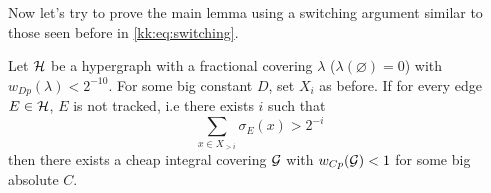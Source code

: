 Now let's try to prove the main lemma using a switching argument 
similar to those seen before in \ref{kk:eq:switching}.

\begin{lemma}
    Let $\mathcal{H}$ be a hypergraph with a fractional covering $\lambda$ 
    ($\lambda(\varnothing) = 0$) with $w_{Dp}(\lambda) < 2^{-10}$. For some big constant $D$, set $X_i$ 
    as before. If for every edge $E \in \mathcal{H}$, $E$ is not tracked, i.e
    there exists $i$ such that 
    \[
    \sum_{x \in X_{>i}} \sigma_E(x) > 2^{-i}
    \]
    then there exists a cheap integral covering $\mathcal{G}$ with $w_{Cp}(\mathcal{G}) < 1$ for some 
    big absolute $C$.
\end{lemma}
